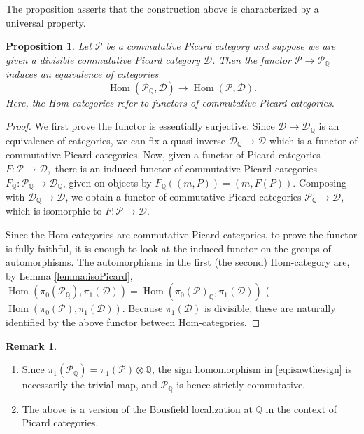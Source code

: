 \documentclass[JEP,XML,SOM,Unicode,published]{cedram}
\theoremstyle{plain}
\newtheorem{proposition}[theorem]{Proposition}
\theoremstyle{definition}
\newtheorem{remark}[theorem]{Remark}
\newcommand{\QBbb}{\mathbb Q}
\newcommand{\Dcal}{\mathcal D}
\newcommand{\Pcal}{\mathcal P}
\DeclareMathOperator{\Hom}{Hom}
\begin{document}
The proposition asserts that the construction above is characterized by a universal property.

\begin{proposition}\label{prop:rationalization}
Let $\Pcal$ be a commutative Picard category and suppose we are given a divisible commutative Picard category $\Dcal$. Then the functor $\Pcal\to\Pcal_{\QBbb}$ induces an equivalence of categories\vspace*{-3pt}\enlargethispage{\baselineskip}
\begin{displaymath}
\Hom(\Pcal_\QBbb, \Dcal) \to \Hom(\Pcal, \Dcal).
\end{displaymath}
Here, the Hom-categories refer to functors of commutative Picard categories.
\end{proposition}
\begin{proof}
We first prove the functor is essentially surjective. Since $\Dcal\to\Dcal_{\QBbb}$ is an equivalence of categories, we can fix a quasi-inverse $\Dcal_{\QBbb}\to\Dcal$ which is a functor of commutative Picard categories. Now, given a functor of Picard categories $F: \Pcal \to \Dcal, $ there is an induced functor of commutative Picard categories $F_\QBbb: \Pcal_\QBbb \to \Dcal_\QBbb$, given on objects by $F_\QBbb((m, P)) = (m, F(P))$. Composing with $\Dcal_{\QBbb}\to\Dcal$, we obtain a functor of commutative Picard categories $\Pcal_{\QBbb}\to\Dcal$, which is isomorphic to $F: \Pcal \to \Dcal$.

Since the Hom-categories are commutative Picard categories, to prove the functor is fully faithful, it is enough to look at the induced functor on the groups of automorphisms. The automorphisms in the first (\resp the second) Hom-category are, by Lemma \ref{lemma:isoPicard},
$\Hom(\pi_0(\Pcal_\QBbb), \pi_1(\Dcal)) = \Hom(\pi_0(\Pcal)_\QBbb, \pi_1(\Dcal))$ (\resp $\Hom(\pi_0(\Pcal), \pi_1(\Dcal))$. Because $\pi_{1}(\Dcal)$ is divisible, these are naturally identified by the above functor between Hom-categories.
\end{proof}

\skpt
\begin{remark}\label{rem:Q-Bousfield}
\begin{enumerate}
\item \label{item:Q-Bousfield-1} Since $\pi_1(\Pcal_\QBbb) = \pi_1(\Pcal)\otimes\QBbb$, the sign homomorphism in \eqref{eq:isawthesign} is necessarily the trivial map, and $\Pcal_\QBbb$ is hence strictly commutative.
\item \label{item:Q-Bousfield-2} The above is a version of the Bousfield localization at $\QBbb$ in the context of Picard categories.
\end{enumerate}
\end{remark}
\end{document}

